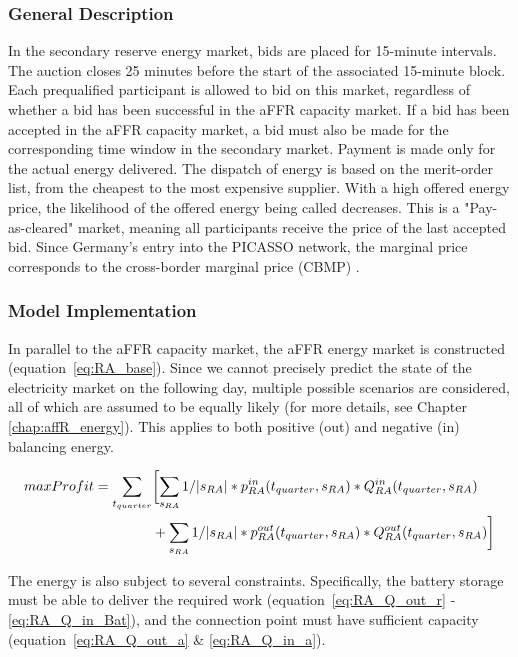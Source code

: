 \subsubsection{General Description}
In the secondary reserve energy market, bids are placed for 15-minute intervals.
The auction closes 25 minutes before the start of the associated 15-minute block. Each prequalified
participant is allowed to bid on this market, regardless of whether a bid has been successful
in the aFFR capacity market. If a bid has been accepted in the aFFR capacity market,
a bid must also be made for the corresponding time window in the secondary market.
Payment is made only for the actual energy delivered. The dispatch of energy is based on the merit-order list,
from the cheapest to the most expensive supplier. With a high offered energy price, the likelihood of the offered
energy being called decreases. This is a "Pay-as-cleared" market, meaning all participants receive the price of the
last accepted bid. Since Germany's entry into the PICASSO network, the marginal price corresponds to the cross-border marginal price
(CBMP) \cite{50hertzamprionTENNETTRANSNETBW.}.

\subsubsection{Model Implementation}
In parallel to the aFFR capacity market, the aFFR energy market is constructed (equation~\ref{eq:RA_base}).
Since we cannot precisely predict the state of the electricity market on the following day,
multiple possible scenarios are considered, all of which are assumed to be equally likely
(for more details, see Chapter \ref{chap:affR_energy}). This applies to both positive (out) and negative (in) balancing energy.

\begin{alignat}{3}
	max Profit =  \sum_{t_{quarter}} & \biggl[ \sum_{s_{RA}}1/|s_{RA}| * p^{in}_{RA}(t_{quarter}, s_{RA}) * Q^{in}_{RA}(t_{quarter}, s_{RA})				\notag              \\
	                                 & + \sum_{s_{RA}}1/|s_{RA}| * p^{out}_{RA}(t_{quarter}, s_{RA}) * Q^{out}_{RA}(t_{quarter}, s_{RA}) \biggr] \label{eq:RA_base}
\end{alignat}

The energy is also subject to several constraints. Specifically,
the battery storage must be able to deliver the required work (equation~\ref{eq:RA_Q_out_r} - \ref{eq:RA_Q_in_Bat}),
and the connection point must have sufficient capacity (equation~\ref{eq:RA_Q_out_a} \& \ref{eq:RA_Q_in_a}).

